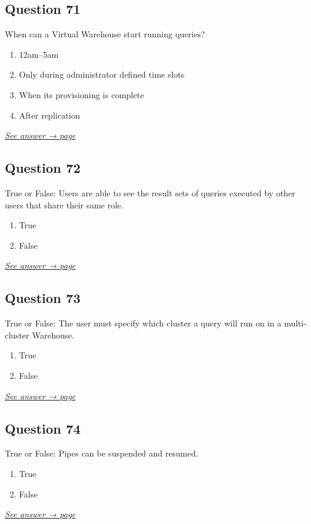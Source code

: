\documentclass[12pt]{article}
\newcommand{\seeanswer}[1]{%
  \par\smallskip\emph{\hyperref[ans:#1]{See answer → page \pageref{ans:#1}}}%
}
\begin{document}
\subsection*{Question 71}\label{q:71}
When can a Virtual Warehouse start running queries?

\begin{enumerate}[label=\Alph*.]
  \item 12am--5am
  \item Only during administrator defined time slots
  \item When its provisioning is complete
  \item After replication
\end{enumerate}
\seeanswer{71}

\subsection*{Question 72}\label{q:72}
True or False: Users are able to see the result sets of queries executed by other users that share their same role.

\begin{enumerate}[label=\Alph*.]
  \item True
  \item False
\end{enumerate}
\seeanswer{72}

\subsection*{Question 73}\label{q:73}
True or False: The user must specify which cluster a query will run on in a multi-cluster Warehouse.

\begin{enumerate}[label=\Alph*.]
  \item True
  \item False
\end{enumerate}
\seeanswer{73}

\subsection*{Question 74}\label{q:74}
True or False: Pipes can be suspended and resumed.

\begin{enumerate}[label=\Alph*.]
  \item True
  \item False
\end{enumerate}
\seeanswer{74}
\end{document}
